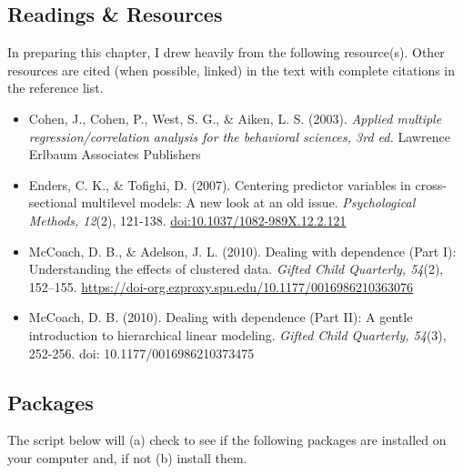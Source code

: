 \documentclass[
  english,
]{book}
\providecommand{\tightlist}{%
  \setlength{\itemsep}{0pt}\setlength{\parskip}{0pt}}
\begin{document}
\hypertarget{readings-resources}{%
\subsection{Readings \& Resources}\label{readings-resources}}

In preparing this chapter, I drew heavily from the following resource(s). Other resources are cited (when possible, linked) in the text with complete citations in the reference list.

\begin{itemize}
\tightlist
\item
  Cohen, J., Cohen, P., West, S. G., \& Aiken, L. S. (2003). \emph{Applied multiple regression/correlation analysis for the behavioral sciences, 3rd ed.} Lawrence Erlbaum Associates Publishers
\item
  Enders, C. K., \& Tofighi, D. (2007). Centering predictor variables in cross-sectional multilevel models: A new look at an old issue. \emph{Psychological Methods, 12}(2), 121-138. \url{doi:10.1037/1082-989X.12.2.121}
\item
  McCoach, D. B., \& Adelson, J. L. (2010). Dealing with dependence (Part I): Understanding the effects of clustered data. \emph{Gifted Child Quarterly, 54}(2), 152--155. \url{https://doi-org.ezproxy.spu.edu/10.1177/0016986210363076}
\item
  McCoach, D. B. (2010). Dealing with dependence (Part II): A gentle introduction to hierarchical linear modeling. \emph{Gifted Child Quarterly, 54}(3), 252-256. doi: 10.1177/0016986210373475
\end{itemize}

\hypertarget{packages-1}{%
\subsection{Packages}\label{packages-1}}

The script below will (a) check to see if the following packages are installed on your computer and, if not (b) install them.
\end{document}

